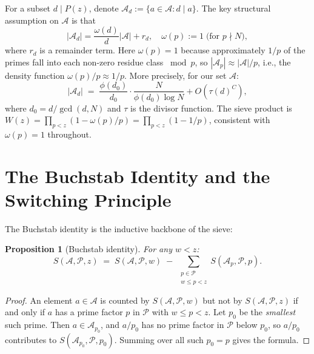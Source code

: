 \documentclass[12pt,a4paper]{amsart}
\newtheorem{proposition}[theorem]{Proposition}
\theoremstyle{definition}
\begin{document}
For a subset $d \mid P(z)$, denote
$\mathcal{A}_d := \{a \in \mathcal{A} : d \mid a\}$.
The key structural assumption on $\mathcal{A}$ is that
\[
  |\mathcal{A}_d| = \frac{\omega(d)}{d}|\mathcal{A}| + r_d,
  \quad
  \omega(p) := 1 \;\text{(for } p\nmid N\text{)},
\]
where $r_d$ is a remainder term.  Here $\omega(p) = 1$ because approximately
$1/p$ of the primes fall into each non-zero residue class $\bmod p$, so
$|\mathcal{A}_p| \approx |\mathcal{A}|/p$, i.e., the density function
$\omega(p)/p \approx 1/p$.  More precisely, for our set $\mathcal{A}$:
\[
  |\mathcal{A}_d| \;=\; \frac{\phi(d_0)}{d_0}\cdot\frac{N}{\phi(d_0)\log N}
  + O\!\left(\tau(d)^C\right),
\]
where $d_0 = d/\gcd(d,N)$ and $\tau$ is the divisor function.  The
sieve product is $W(z) = \prod_{p < z}(1 - \omega(p)/p) = \prod_{p<z}(1 - 1/p)$,
consistent with $\omega(p) = 1$ throughout.

\section{The Buchstab Identity and the Switching Principle}

The Buchstab identity is the inductive backbone of the sieve:

\begin{proposition}[Buchstab identity]\label{prop:buchstab}
  For any $w < z$:
  \[
    S(\mathcal{A}, \mathcal{P}, z)
    \;=\;
    S(\mathcal{A}, \mathcal{P}, w)
    \;-\;
    \sum_{\substack{p \in \mathcal{P} \\ w \leq p < z}}
    S(\mathcal{A}_p, \mathcal{P}, p).
  \]
\end{proposition}

\begin{proof}
  An element $a \in \mathcal{A}$ is counted by $S(\mathcal{A},\mathcal{P},w)$
  but not by $S(\mathcal{A},\mathcal{P},z)$ if and only if $a$ has a prime
  factor $p$ in $\mathcal{P}$ with $w \leq p < z$.  Let $p_0$ be the
  \emph{smallest} such prime.  Then $a \in \mathcal{A}_{p_0}$, and
  $a/p_0$ has no prime factor in $\mathcal{P}$ below $p_0$, so $a/p_0$
  contributes to $S(\mathcal{A}_{p_0}, \mathcal{P}, p_0)$.
  Summing over all such $p_0 = p$ gives the formula.  \qedhere
\end{proof}
\end{document}
